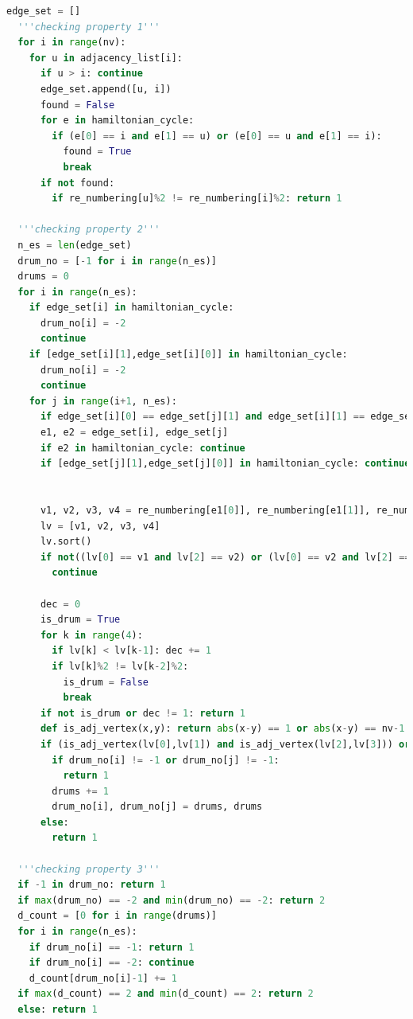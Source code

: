 \documentclass[11pt]{article}
\begin{document}
\begin{lstlisting}[language=Python]
  edge_set = []
  '''checking property 1'''
  for i in range(nv):
    for u in adjacency_list[i]:
      if u > i: continue
      edge_set.append([u, i])
      found = False
      for e in hamiltonian_cycle:
        if (e[0] == i and e[1] == u) or (e[0] == u and e[1] == i):
          found = True
          break
      if not found:
        if re_numbering[u]%2 != re_numbering[i]%2: return 1

  '''checking property 2'''
  n_es = len(edge_set)
  drum_no = [-1 for i in range(n_es)]
  drums = 0
  for i in range(n_es):
    if edge_set[i] in hamiltonian_cycle:
      drum_no[i] = -2
      continue
    if [edge_set[i][1],edge_set[i][0]] in hamiltonian_cycle:
      drum_no[i] = -2
      continue
    for j in range(i+1, n_es):
      if edge_set[i][0] == edge_set[j][1] and edge_set[i][1] == edge_set[j][0]: continue
      e1, e2 = edge_set[i], edge_set[j]
      if e2 in hamiltonian_cycle: continue
      if [edge_set[j][1],edge_set[j][0]] in hamiltonian_cycle: continue


      v1, v2, v3, v4 = re_numbering[e1[0]], re_numbering[e1[1]], re_numbering[e2[0]], re_numbering[e2[1]]
      lv = [v1, v2, v3, v4]
      lv.sort()
      if not((lv[0] == v1 and lv[2] == v2) or (lv[0] == v2 and lv[2] == v1) or (lv[1] == v1 and lv[3] == v2) or (lv[1] == v2 and lv[3] == v1)):
        continue
      
      dec = 0
      is_drum = True
      for k in range(4):
        if lv[k] < lv[k-1]: dec += 1
        if lv[k]%2 != lv[k-2]%2:
          is_drum = False
          break
      if not is_drum or dec != 1: return 1
      def is_adj_vertex(x,y): return abs(x-y) == 1 or abs(x-y) == nv-1
      if (is_adj_vertex(lv[0],lv[1]) and is_adj_vertex(lv[2],lv[3])) or (is_adj_vertex(lv[0],lv[3]) and is_adj_vertex(lv[1],lv[2])):
        if drum_no[i] != -1 or drum_no[j] != -1:
          return 1
        drums += 1
        drum_no[i], drum_no[j] = drums, drums
      else:
        return 1

  '''checking property 3'''
  if -1 in drum_no: return 1
  if max(drum_no) == -2 and min(drum_no) == -2: return 2
  d_count = [0 for i in range(drums)]
  for i in range(n_es):
    if drum_no[i] == -1: return 1
    if drum_no[i] == -2: continue
    d_count[drum_no[i]-1] += 1
  if max(d_count) == 2 and min(d_count) == 2: return 2
  else: return 1


\end{lstlisting}
\end{document}
